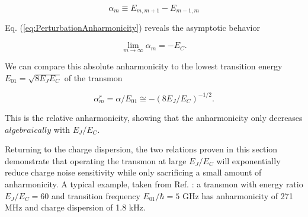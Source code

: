 \documentclass[11 pt, oneside]{book} %
\begin{document}
\begin{equation}
\alpha_m \equiv E_{m,m+1}-E_{m-1,m}
\end{equation}

Eq. (\ref{eq:PerturbationAnharmonicity}) reveals the asymptotic behavior

\begin{equation}
\lim_{m\rightarrow\infty}\alpha_m =-E_C.
\end{equation}

We can compare this absolute anharmonicity to the lowest transition energy $E_{01}=\sqrt{8E_JE_C}$ of the transmon

\begin{equation}
\alpha_m^r = \alpha/E_{01}\cong-(8E_J/E_C)^{-1/2}.
\end{equation}

This is the relative anharmonicity, showing that the anharmonicity only decreases $algebraically$ with $E_J/E_C$.

Returning to the charge dispersion, the two relations proven in this section demonstrate that operating the transmon at large $E_J/E_C$ will exponentially reduce charge noise sensitivity while only sacrificing a small amount of anharmonicity. A typical example, taken from Ref. \cite{Bishop}: a transmon with energy ratio $E_J/E_C=60$ and transition frequency $E_01/\hbar=5$ GHz has anharmonicity of 271 MHz and charge dispersion of 1.8 kHz. 
\end{document}
